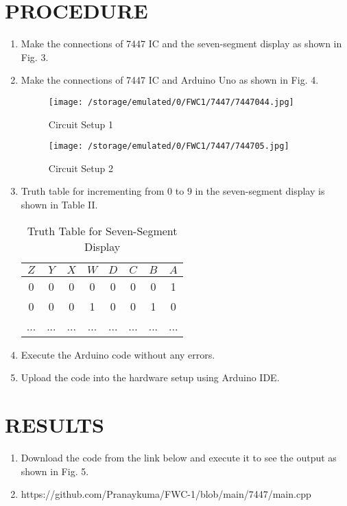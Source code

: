 \documentclass[conference]{IEEEtran}
\begin{document}
\section{PROCEDURE}
\begin{enumerate}
\item Make the connections of 7447 IC and the seven-segment display as shown in Fig. 3.
\item Make the connections of 7447 IC and Arduino Uno as shown in Fig. 4.

\begin{figure}[htbp] 
\centering 
\texttt{[image: /storage/emulated/0/FWC1/7447/7447044.jpg]}
\caption{\label{fig-3:Gates} Circuit Setup 1}    
\end{figure}

\begin{figure}[htbp]                     
\centering                           
\texttt{[image: /storage/emulated/0/FWC1/7447/744705.jpg]}                                 
\caption{\label{fig-4:Gates} Circuit Setup 2}         
\end{figure}

\item Truth table for incrementing from $0$ to $9$ in the seven-segment display is shown in Table II.

\begin{table}[htbp]
\centering
\begin{tabular}{| c | c | c | c | c | c | c | c |} 
\hline
$Z$ & $Y$ & $X$ & $W$ & $D$ & $C$ & $B$ & $A$ \\
\hline
0   & 0   & 0   & 0   & 0  & 0 & 0  & 1 \\
0   & 0   & 0   & 1   & 0  & 0 & 1  & 0 \\
... & ... & ... & ... & ... & ... & ... & ... \\ 
\hline
\end{tabular}
\vspace{0.15cm}
\caption{\label{tab:widgets} Truth Table for Seven-Segment Display}
\end{table}

\item Execute the Arduino code without any errors.
\item Upload the code into the hardware setup using Arduino IDE.
\end{enumerate}

\section{RESULTS}
\begin{enumerate}
\item Download the code from the link below and execute it to see the output as shown in Fig. 5.
\item https://github.com/Pranaykuma/FWC-1/blob/main/7447/main.cpp
\end{enumerate}
\end{document}
